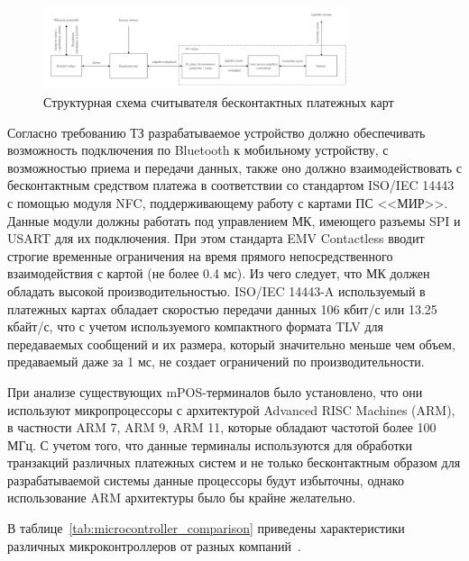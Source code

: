 \begin{figure}[H]
    \centering
    \includegraphics[width=0.8\textwidth]{images/design/apparat_struct}
    \caption{\centering Структурная схема считывателя бесконтактных платежных карт}
    \label{fig:apparat_struct}
\end{figure}


Согласно требованию ТЗ разрабатываемое устройство должно обеспечивать возможность подключения по Bluetooth к мобильному устройству, с возможностью приема и передачи данных, также оно должно взаимодействовать с бесконтактным средством платежа в соответствии со стандартом ISO/IEC 14443 с помощью модуля NFC, поддерживающему работу с картами ПС <<МИР>>.
Данные модули должны работать под управлением МК, имеющего разъемы SPI и USART для их подключения.
При этом стандарта EMV Contactless вводит строгие временные ограничения на время прямого непосредственного взаимодействия с картой (не более 0.4 мс).
Из чего следует, что МК должен обладать высокой производительностью.
ISO/IEC 14443-A используемый в платежных картах обладает скоростью передачи данных 106 кбит/с или 13.25 кбайт/с, что с учетом используемого компактного формата TLV для передаваемых сообщений и их размера, который значительно меньше чем объем, предаваемый даже за 1 мс, не создает ограничений по производительности.

При анализе существующих mPOS-терминалов было установлено, что они используют микропроцессоры с архитектурой Advanced RISC Machines (ARM), в частности ARM 7, ARM 9, ARM 11, которые обладают частотой более 100 МГц.
С учетом того, что данные терминалы используются для обработки транзакций различных платежных систем и не только бесконтактным образом для разрабатываемой системы данные процессоры будут избыточны, однако использование ARM архитектуры было бы крайне желательно.

В таблице~\ref{tab:microcontroller_comparison} приведены характеристики различных микроконтроллеров от разных компаний~\cite{stm32f103_datasheet}\cite{atmega328p_datasheet}.

